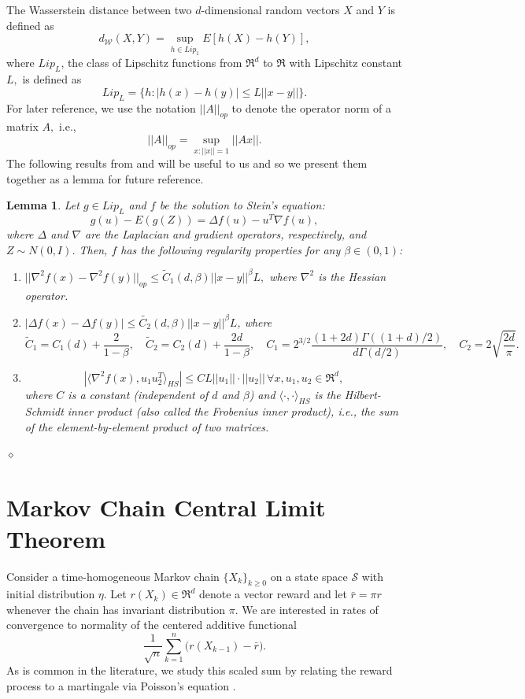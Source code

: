 \documentclass[10pt,a4paper]{article}
\newtheorem{lemma}{Lemma}
\begin{document}
The Wasserstein distance between two $d$-dimensional random vectors $X$ and $Y$ is defined as
$$d_{\mathcal{W}}(X,Y)=\sup_{h\in Lip_1} E[h(X)-h(Y)],$$
where $Lip_L$, the class of Lipschitz functions from $\Re^d$ to $\Re$  with Lipschitz constant $L,$ is defined as
$$Lip_L=\{h: |h(x)-h(y)|\leq L||x-y||\}.$$
For later reference, we use the notation $||A||_{op}$  to denote the operator norm of a matrix $A,$ i.e., $$||A||_{op}=\sup_{x: ||x||=1}||Ax||.$$
The following results from \cite[Propositions 2.2 and 2.3]{gallouet2018regularity} and \cite[Theorem 3.1]{fang2019multivariate} will be useful to us and so we present them together as a lemma for future reference.
\begin{lemma}\label{lem: regularity}
Let $g\in Lip_L$ and $f$ be the solution to Stein's equation:
\begin{equation}\label{eq: Stein}
    g(u)-E(g(Z))=\Delta f(u)-u^T\nabla f(u),
\end{equation}
where $\Delta$ and $\nabla$ are the Laplacian and gradient operators, respectively, and $Z\sim N(0,I)$. Then, $f$ has the following regularity properties for any $\beta\in (0,1)$:
\begin{enumerate}
    \item $||\nabla^2f(x)-\nabla^2f(y)||_{op}\leq \tilde{C}_1(d,\beta)||x-y||^\beta L,$ where $\nabla^2$ is the Hessian operator.
    \item $|\Delta f(x)-\Delta f(y)|\leq \tilde{C_2}(d,\beta)||x-y||^\beta L$,
where  $$\tilde{C}_1=C_1(d)+\frac{2}{1-\beta}, \quad \tilde{C}_2=C_2(d)+\frac{2d}{1-\beta}, \quad 
C_1=2^{3/2}\frac{(1+2d)\Gamma((1+d)/2)}{d\Gamma(d/2)},\quad C_2=2\sqrt{\frac{2d}{\pi}}.$$
    \item  $$\left|\langle\nabla^2 f(x),u_1u_2^T\rangle_{HS}\right|\leq C L||u_1||\cdot||u_2||\,\forall x, u_1, u_2\in \Re^d,$$ where $C$ is a constant (independent of $d$ and $\beta$) and $\langle\cdot,\cdot\rangle_{HS}$ is the Hilbert-Schmidt inner product (also called the Frobenius inner product), i.e., the sum of the element-by-element product of two matrices.
\end{enumerate}
\hfill $\diamond$
\end{lemma}

\section{Markov Chain Central Limit Theorem}\label{sec: Markov}
Consider a time-homogeneous Markov chain $\{X_k\}_{k\geq 0}$ on a state space $\mathcal{S}$ with initial distribution $\eta$. Let $r(X_k)\in\Re^d$ denote a vector reward and let $\bar r=\pi r$ whenever the chain has invariant distribution $\pi$. We are interested in rates of convergence to normality of the centered additive functional
\[
    \frac{1}{\sqrt n}\sum_{k=1}^n\bigl(r(X_{k-1})-\bar r\bigr).
\]
As is common in the literature, we study this scaled sum by relating the reward process to a martingale via Poisson's equation \citep{douc2018markov,makowski2002poisson,glynn1996liapounov,glynn2023solution}.
\end{document}
